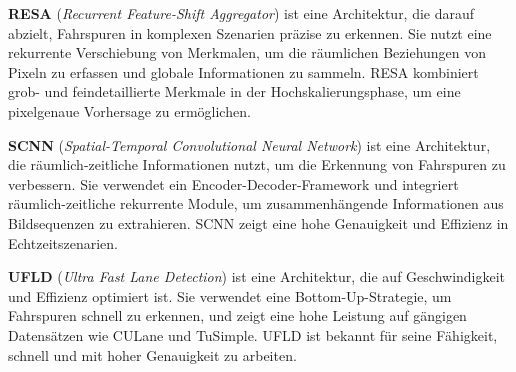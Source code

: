 \documentclass{article}
\begin{document}
                \textbf{RESA} (\textit{Recurrent Feature-Shift Aggregator}) ist eine Architektur, die darauf abzielt, Fahrspuren in komplexen Szenarien präzise zu erkennen. Sie nutzt eine rekurrente Verschiebung von Merkmalen, um die räumlichen Beziehungen von Pixeln zu erfassen und globale Informationen zu sammeln. RESA kombiniert grob- und feindetaillierte Merkmale in der Hochskalierungsphase, um eine pixelgenaue Vorhersage zu ermöglichen.
                \cite{Zheng2020RESA}

                \textbf{SCNN} (\textit{Spatial-Temporal Convolutional Neural Network}) ist eine Architektur, die räumlich-zeitliche Informationen nutzt, um die Erkennung von Fahrspuren zu verbessern. Sie verwendet ein Encoder-Decoder-Framework und integriert räumlich-zeitliche rekurrente Module, um zusammenhängende Informationen aus Bildsequenzen zu extrahieren. SCNN zeigt eine hohe Genauigkeit und Effizienz in Echtzeitszenarien.
                \cite{Li2024Enhanced}

                \textbf{UFLD} (\textit{Ultra Fast Lane Detection}) ist eine Architektur, die auf Geschwindigkeit und Effizienz optimiert ist. Sie verwendet eine Bottom-Up-Strategie, um Fahrspuren schnell zu erkennen, und zeigt eine hohe Leistung auf gängigen Datensätzen wie CULane und TuSimple. UFLD ist bekannt für seine Fähigkeit, schnell und mit hoher Genauigkeit zu arbeiten.
                \cite{Xu2024Exploring}
\end{document}
